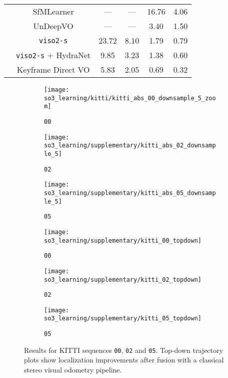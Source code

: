 \begin{table*}[]
{\begin{threeparttable}
\begin{tabular}{cccccc}
		& SfMLearner & --- & --- & 16.76 & 4.06 \\
		& UnDeepVO & --- & --- & 3.40 & 1.50 \\
		& \texttt{viso2-s} & 23.72 & 8.10 & 1.79 & 0.79 \\
		& \texttt{viso2-s} + HydraNet & 9.85 & 3.23 & 1.38 & 0.60 \\
		& Keyframe Direct VO & 5.83 & 2.05 & 0.69 & 0.32 \\ \bottomrule
	\end{tabular}
\label{tab:kitti_fusion_stats}
\end{threeparttable}
}
\end{table*}

\begin{figure*}[h!]
	\centering
	\begin{subfigure}[]{0.45\textwidth}
		\texttt{[image: so3\_learning/kitti/kitti\_abs\_00\_downsample\_5\_zoom]}
		\caption{\texttt{00}}
	\end{subfigure}
	\begin{subfigure}[]{0.45\textwidth} 
		\texttt{[image: so3\_learning/supplementary/kitti\_abs\_02\_downsample\_5]}
		\caption{\texttt{02}}
	\end{subfigure}
	\begin{subfigure}[]{0.45\textwidth} 
		\texttt{[image: so3\_learning/supplementary/kitti\_abs\_05\_downsample\_5]}
		\caption{\texttt{05}}
	\end{subfigure}
	\begin{subfigure}[]{0.45\textwidth} 
		\texttt{[image: so3\_learning/supplementary/kitti\_00\_topdown]}
		\caption{\texttt{00}}
	\end{subfigure}
	\begin{subfigure}[]{0.45\textwidth} 
		\texttt{[image: so3\_learning/supplementary/kitti\_02\_topdown]}
		\caption{\texttt{02}}
	\end{subfigure}
	\begin{subfigure}[]{0.45\textwidth} 
		\texttt{[image: so3\_learning/supplementary/kitti\_05\_topdown]}
		\caption{\texttt{05}}
	\end{subfigure}
	\caption{Results for KITTI sequences \texttt{00}, \texttt{02} and \texttt{05}. Top-down trajectory plots show localization improvements after fusion with a classical stereo visual odometry pipeline.}
	\label{fig:hydranet_kitti_topdown}
\end{figure*}


